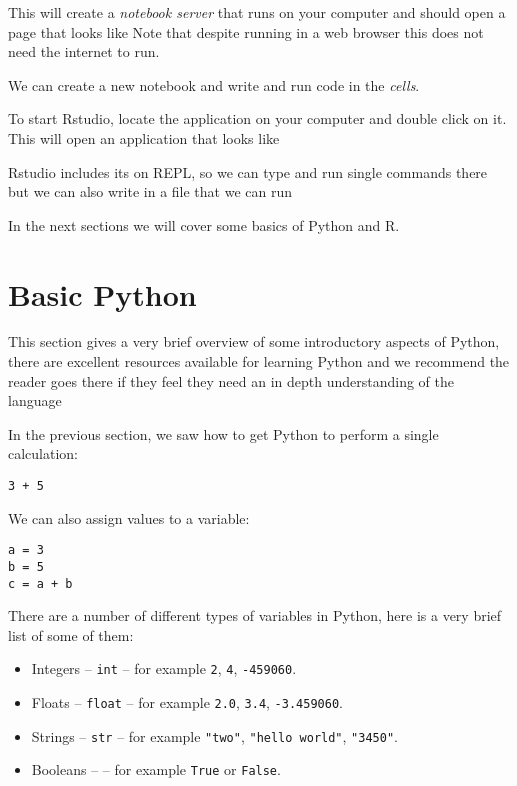 This will create a \textit{notebook server} that runs on your computer and
should open a page that looks like %
Note that despite running in a web browser this does not need the internet to
run.

We can create a new notebook and write and run code in the \textit{cells}.

To start Rstudio, locate the application on your computer and double click on
it. This will open an application that looks like %

Rstudio includes its on REPL, so we can type and run single commands there but
we can also write in a file that we can run

In the next sections we will cover some basics of Python and R.

\section{Basic Python}\label{sec:basic-python}

This section gives a very brief overview of some introductory aspects of Python,
there are excellent resources available for learning Python and we recommend the
reader goes there if they feel they need an in depth understanding of the
language %

In the previous section, we saw how to get Python to perform a single
calculation:

\begin{verbatim}
3 + 5
\end{verbatim}

We can also assign values to a variable:

\begin{verbatim}
a = 3
b = 5
c = a + b
\end{verbatim}

There are a number of different types of variables in Python, here is a very
brief list of some of them:

\begin{itemize}
    \item Integers -- \texttt{int} -- for example \texttt{2},
        \texttt{4}, \texttt{-459060}.
    \item Floats -- \texttt{float} -- for example \texttt{2.0},
        \texttt{3.4}, \texttt{-3.459060}.
    \item Strings -- \texttt{str} -- for example \texttt{"two"}, \texttt{"hello
        world"}, \texttt{"3450"}.
    \item Booleans --  -- for example \texttt{True} or
        \texttt{False}.
\end{itemize}

